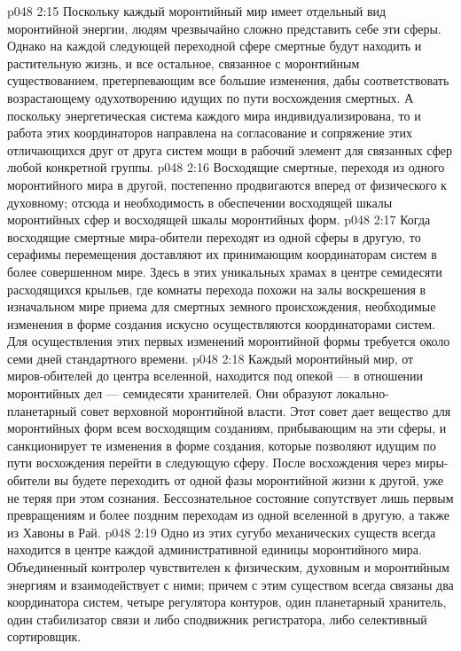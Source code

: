 \vs p048 2:15 \pc {}\bibnobreakspace {} Поскольку каждый моронтийный мир имеет отдельный вид моронтийной энергии, людям чрезвычайно сложно представить себе эти сферы. Однако на каждой следующей переходной сфере смертные будут находить и растительную жизнь, и все остальное, связанное с моронтийным существованием, претерпевающим все большие изменения, дабы соответствовать возрастающему одухотворению идущих по пути восхождения смертных. А поскольку энергетическая система каждого мира индивидуализирована, то и работа этих координаторов направлена на согласование и сопряжение этих отличающихся друг от друга систем мощи в рабочий элемент для связанных сфер любой конкретной группы.
\vs p048 2:16 Восходящие смертные, переходя из одного моронтийного мира в другой, постепенно продвигаются вперед от физического к духовному; отсюда и необходимость в обеспечении восходящей шкалы моронтийных сфер и восходящей шкалы моронтийных форм.
\vs p048 2:17 Когда восходящие смертные мира\hyp{}обители переходят из одной сферы в другую, то серафимы перемещения доставляют их принимающим координаторам систем в более совершенном мире. Здесь в этих уникальных храмах в центре семидесяти расходящихся крыльев, где комнаты перехода похожи на залы воскрешения в изначальном мире приема для смертных земного происхождения, необходимые изменения в форме создания искусно осуществляются координаторами систем. Для осуществления этих первых изменений моронтийной формы требуется около семи дней стандартного времени.
\vs p048 2:18 \pc {}\bibnobreakspace {} Каждый моронтийный мир, от миров\hyp{}обителей до центра вселенной, находится под опекой --- в отношении моронтийных дел --- семидесяти хранителей. Они образуют локально\hyp{}планетарный совет верховной моронтийной власти. Этот совет дает вещество для моронтийных форм всем восходящим созданиям, прибывающим на эти сферы, и санкционирует те изменения в форме создания, которые позволяют идущим по пути восхождения перейти в следующую сферу. После восхождения через миры\hyp{}обители вы будете переходить от одной фазы моронтийной жизни к другой, уже не теряя при этом сознания. Бессознательное состояние сопутствует лишь первым превращениям и более поздним переходам из одной вселенной в другую, а также из Хавоны в Рай.
\vs p048 2:19 \pc {}\bibnobreakspace {} Одно из этих сугубо механических существ всегда находится в центре каждой административной единицы моронтийного мира. Объединенный контролер чувствителен к физическим, духовным и моронтийным энергиям и взаимодействует с ними; причем с этим существом всегда связаны два координатора систем, четыре регулятора контуров, один планетарный хранитель, один стабилизатор связи и либо сподвижник регистратора, либо селективный сортировщик.
